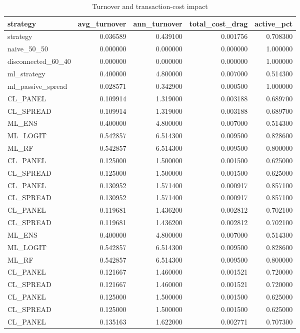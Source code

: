 \begin{table}
\caption{Turnover and transaction-cost impact}
\label{tab:7_2}
\begin{tabular}{lrrrr}
\toprule
strategy & avg_turnover & ann_turnover & total_cost_drag & active_pct \\
\midrule
strategy & 0.036589 & 0.439100 & 0.001756 & 0.708300 \\
naive_50_50 & 0.000000 & 0.000000 & 0.000000 & 1.000000 \\
disconnected_60_40 & 0.000000 & 0.000000 & 0.000000 & 1.000000 \\
ml_strategy & 0.400000 & 4.800000 & 0.007000 & 0.514300 \\
ml_passive_spread & 0.028571 & 0.342900 & 0.000500 & 1.000000 \\
CL_PANEL & 0.109914 & 1.319000 & 0.003188 & 0.689700 \\
CL_SPREAD & 0.109914 & 1.319000 & 0.003188 & 0.689700 \\
ML_ENS & 0.400000 & 4.800000 & 0.007000 & 0.514300 \\
ML_LOGIT & 0.542857 & 6.514300 & 0.009500 & 0.828600 \\
ML_RF & 0.542857 & 6.514300 & 0.009500 & 0.800000 \\
CL_PANEL & 0.125000 & 1.500000 & 0.001500 & 0.625000 \\
CL_SPREAD & 0.125000 & 1.500000 & 0.001500 & 0.625000 \\
CL_PANEL & 0.130952 & 1.571400 & 0.000917 & 0.857100 \\
CL_SPREAD & 0.130952 & 1.571400 & 0.000917 & 0.857100 \\
CL_PANEL & 0.119681 & 1.436200 & 0.002812 & 0.702100 \\
CL_SPREAD & 0.119681 & 1.436200 & 0.002812 & 0.702100 \\
ML_ENS & 0.400000 & 4.800000 & 0.007000 & 0.514300 \\
ML_LOGIT & 0.542857 & 6.514300 & 0.009500 & 0.828600 \\
ML_RF & 0.542857 & 6.514300 & 0.009500 & 0.800000 \\
CL_PANEL & 0.121667 & 1.460000 & 0.001521 & 0.720000 \\
CL_SPREAD & 0.121667 & 1.460000 & 0.001521 & 0.720000 \\
CL_PANEL & 0.125000 & 1.500000 & 0.001500 & 0.625000 \\
CL_SPREAD & 0.125000 & 1.500000 & 0.001500 & 0.625000 \\
CL_PANEL & 0.135163 & 1.622000 & 0.002771 & 0.707300 \\

\end{tabular}
\end{table}
